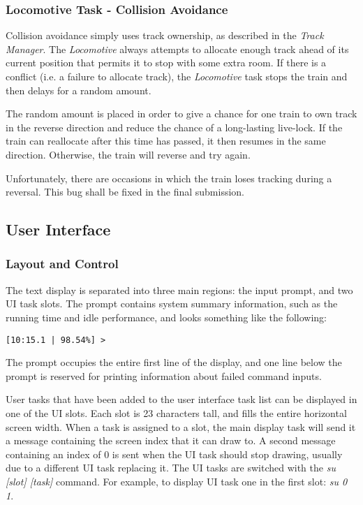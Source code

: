 \documentclass[twoside,a4paper]{refart}
\begin{document}
\subsubsection{Locomotive Task - Collision Avoidance}
Collision avoidance simply uses track ownership, as described in the \textit{Track Manager}. The \textit{Locomotive} always attempts to allocate enough track ahead of its current position that permits it to stop with some extra room. If there is a conflict (i.e. a failure to allocate track), the \textit{Locomotive} task stops the train and then delays for a random amount.

The random amount is placed in order to give a chance for one train to own track in the reverse direction and reduce the chance of a long-lasting live-lock. If the train can reallocate after this time has passed, it then resumes in the same direction. Otherwise, the train will reverse and try again.

Unfortunately, there are occasions in which the train loses tracking during a reversal. This bug shall be fixed in the final submission.

\subsection{User Interface}
\subsubsection{Layout and Control}
The text display is separated into three main regions: the input prompt, and two UI task slots. The prompt contains system summary information, such as the running time and idle performance, and looks something like the following:
\begin{verbatim}
[10:15.1 | 98.54%] > 
\end{verbatim}

The prompt occupies the entire first line of the display, and one line below the prompt is reserved for printing information about failed command inputs.

User tasks that have been added to the user interface task list can be displayed in one of the UI slots. Each slot is 23 characters tall, and fills the entire horizontal screen width. When a task is assigned to a slot, the main display task will send it a message containing the screen index that it can draw to. A second message containing an index of 0 is sent when the UI task should stop drawing, usually due to a different UI task replacing it. The UI tasks are switched with the \textit{su [slot] [task]} command. For example, to display UI task one in the first slot: \textit{su 0 1}.
\end{document}
